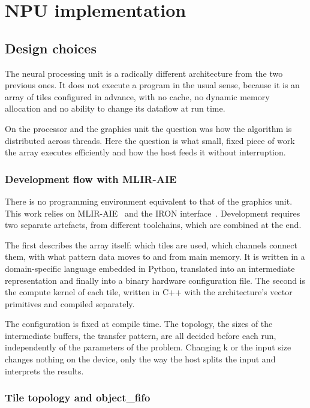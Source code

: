 \chapter{NPU implementation}
\label{ch:npu}

\section{Design choices}
\label{sec:npu-design}

The neural processing unit is a radically different architecture from the two
previous ones. It does not execute a program in the usual sense, because it is
an array of tiles configured in advance, with no cache, no dynamic memory
allocation and no ability to change its dataflow at run time.

On the processor and the graphics unit the question was how the algorithm is
distributed across threads. Here the question is what small, fixed piece of
work the array executes efficiently and how the host feeds it without
interruption.

\subsection{Development flow with MLIR-AIE}
\label{sec:npu-toolchain}

There is no programming environment equivalent to that of the graphics unit.
This work relies on MLIR-AIE~\cite{mliraie} and the IRON interface~\cite{iron}.
Development requires two separate artefacts, from different toolchains, which
are combined at the end.

The first describes the array itself: which tiles are used, which channels
connect them, with what pattern data moves to and from main memory. It is
written in a domain-specific language embedded in Python, translated into an
intermediate representation and finally into a binary hardware configuration
file. The second is the compute kernel of each tile, written in C++ with the
architecture's vector primitives and compiled separately.

The configuration is fixed at compile time. The topology, the sizes of the
intermediate buffers, the transfer pattern, are all decided before each run,
independently of the parameters of the problem. Changing k or the input size
changes nothing on the device, only the way the host splits the input and
interprets the results.

\subsection{Tile topology and object\_fifo}
\label{sec:npu-objectfifo}

